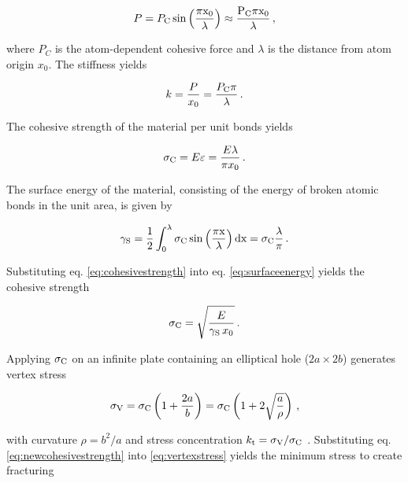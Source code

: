 \documentclass[format=acmtog, 12pt, screen=true, review=false]{acmart}
\begin{document}
\begin{equation}
\label{eq:minforce}
    P = P_{\rm{C}}\,\rm{sin}\left(\frac{\pi x_{\rm{0}}}{\lambda}\right)\approx \frac{P_{\rm{C}}\pi x_{\rm{0}}}{\lambda}\,,
\end{equation}

where $P_C$ is the atom-dependent cohesive force and $\lambda$ is the distance from atom origin $x_0$. The stiffness yields

\begin{equation}
    k=\frac{P}{x_0}=\frac{P_{\rm{C}}\pi}{\lambda}\,.
\end{equation}

The cohesive strength of the material per unit bonds yields

\begin{equation}
\label{eq:cohesivestrength}
    \sigma_{\rm{C}}=E\varepsilon=\frac{E\lambda}{\pi x_{\rm{0}}} \,.
\end{equation}

The surface energy of the material, consisting of the energy of broken atomic bonds in the unit area, is given by

\begin{equation}
    \label{eq:surfaceenergy}
    \gamma_{\rm{S}}=\frac{1}{2}\int_{0}^{\lambda}\sigma_{\rm{C}}\,\rm{sin}\left(\frac{\pi x}{\lambda}\right)dx=\sigma_{\rm{C}}\frac{\lambda}{\pi} \,.
\end{equation}

Substituting eq. \ref{eq:cohesivestrength} into eq. \ref{eq:surfaceenergy} yields the cohesive strength

\begin{equation}
    \label{eq:newcohesivestrength}
    \sigma_{\rm{C}}=\sqrt{\frac{E}{\gamma_{\rm{S}}\,x_{\rm{0}}}}\,.
\end{equation}

Applying $\sigma_{\rm{C}}$ on an infinite plate containing an elliptical hole ($2a \times 2b$) generates vertex stress

\begin{equation}
\label{eq:vertexstress}
    \sigma_{\rm{V}}=\sigma_{\rm{C}}\left(1+\frac{2a}{b}\right)=\sigma_{\rm{C}}\left(1+2\sqrt{\frac{a}{\rho}}\right)\,,
\end{equation}

with curvature $\rho=b^2/a$ and stress concentration $k_{\rm{t}} = \sigma_{\rm{V}} / \sigma_{\rm{C}}$ \cite{And05}. Substituting eq. \ref{eq:newcohesivestrength} into \ref{eq:vertexstress} yields the minimum stress to create fracturing 
\end{document}
